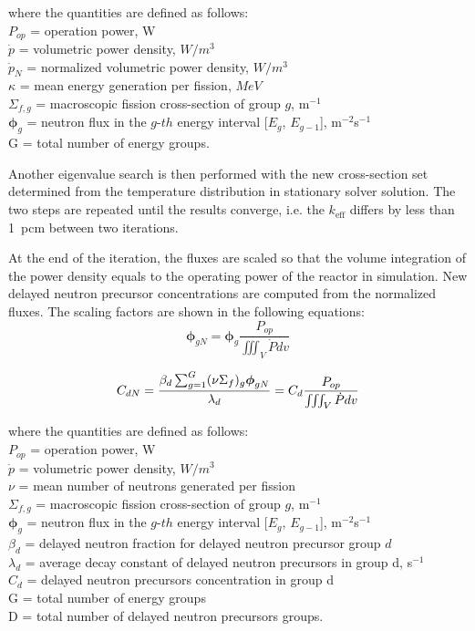 \documentclass{elsarticle}
\newcommand{\keff}{{\ensuremath{k_{\mathrm{eff}}}} }
\newcommand{\flux}{{\ensuremath{\boldsymbol{\phi}}} }
\begin{document}
where the quantities are defined as follows:\\
$P_{op}$ = operation power, W\\
$\dot{p}$ = volumetric power density, $W/m^3$\\
$\dot{p}_N$ = normalized volumetric power density, $W/m^3$\\
$\kappa$ = mean energy generation per fission, $MeV$\\
$\Sigma_{f,g}$ = macroscopic fission cross-section of group $g$, m$^{-1}$\\
$\flux_{g}$ = neutron flux in the $g$-$th$ energy interval [$E_g$, $E_{g-1}$], m$^{-2}$s$^{-1}$\\
G = total number of energy groups.
 
Another eigenvalue search is then performed with the new cross-section set determined from the temperature distribution in stationary solver solution. 
The two steps are repeated until the results converge, i.e. the \keff differs by less than 1~pcm between two iterations.

At the end of the iteration, the fluxes are scaled so that the volume integration of the power density equals to the operating power of the reactor in simulation. New delayed neutron precursor concentrations are computed from the normalized fluxes. The scaling factors are shown in the following equations:
\begin{equation}
    \flux_{gN} = \flux_g \frac{P_{op}}{\iiint_V{\dot{P}dv}}
\end{equation}

\begin{equation}
      C_{dN} = \frac{\beta_d \sum_{g=1}^G (\nu\Sigma_f)_g \flux_{gN}}{\lambda_d}\\
      = C_d\frac{P_{op}}{\iiint_V{\dot{P}dv}}
\end{equation}

where the quantities are defined as follows:\\
$P_{op}$ = operation power, W\\
$\dot{p}$ = volumetric power density, $W/m^3$\\
$\nu$ = mean number of neutrons generated per fission\\
$\Sigma_{f,g}$ = macroscopic fission cross-section of group $g$, m$^{-1}$\\
  $\flux_{g}$ = neutron flux in the $g$-$th$ energy interval [$E_g$, $E_{g-1}$], m$^{-2}$s$^{-1}$
\\
  $\beta_d$ = delayed neutron fraction for delayed neutron precursor group $d$
\\
  $\lambda_d$ = average decay constant of delayed neutron precursors in group d, s$^{-1}$
\\
  $C_d$ = delayed neutron precursors concentration in group d
 \\
 G = total number of energy groups\\
 D = total number of delayed neutron precursors groups.
\end{document}
